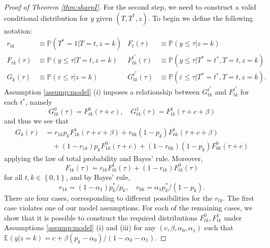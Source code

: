 \begin{proof}[Proof of Theorem \ref{thm:sharpI}]
For the second step, we need to construct a valid conditional distribution for $y$ given $(T,T^*,z)$.
To begin we define the following notation:
\begin{align*}
r_{tk} &\equiv \mathbb{P}(T^*=1|T=t,z=k) &
F_{t}(\tau) &\equiv \mathbb{P}(y \leq \tau|z=k) \\
F_{tk}(\tau) &\equiv \mathbb{P}(y \leq \tau|T=t, z=k) & 
F_{tk}^{t^*}(\tau) &\equiv \mathbb{P}(y \leq \tau|T^*=t^*,T=t, z=k)\\
G_k(\tau) &\equiv \mathbb{P}(\varepsilon \leq \tau|z=k) &
G^{t^*}_{tk}(\tau) &\equiv \mathbb{P}(\varepsilon \leq \tau|T^*=t^*, T=t,z=k).
\end{align*}
Assumption \ref{assump:model} (i) imposes a relationship between $G^{t^*}_{tk}$ and $F^{t^*}_{tk}$ for each $t^*$, namely 
\begin{equation}
  G^0_{tk}(\tau) = F^0_{tk}(\tau + c), \quad
  G^1_{tk}(\tau) = F^1_{tk}(\tau + c + \beta)
  \label{eq:Gtstartk}
\end{equation}
and thus we see that
\begin{align}
  G_k(\tau) &= r_{1k}p_k F^1_{1k}(\tau + c + \beta) + r_{0k}(1 - p_k) F^1_{0k}(\tau + c + \beta) \nonumber \\
  &\quad +  (1 - r_{1k})p_k F^0_{1k}(\tau + c) + (1 - r_{0k})(1 - p_k) F^0_{0k}(\tau + c)
  \label{eq:Gk}
\end{align}
applying the law of total probability and Bayes' rule.
Moreover,
\begin{equation}
  F_{tk}(\tau) = r_{tk} F_{tk}^1(\tau) + (1 - r_{tk}) F_{tk}^0(\tau)
  \label{eq:Ftk}
\end{equation}
for all $t,k \in \left\{ 0,1 \right\}$, and by Bayes' rule,
\begin{equation}
  r_{1k} = (1 - \alpha_1)p_k^*/p_k, \quad
  r_{0k} = \alpha_1p_k^*/(1 - p_k).
  \label{eq:rtk}
\end{equation}
There are four cases, corresponding to different possibilities for the $r_{tk}$.
The first case violates one of our model assumptions.
For each of the remaining cases, we show that it is possible to construct the required distributions $F_{tk}^0, F_{tk}^1$ under Assumptions \ref{assump:model} (i) and (iii) for any $(c,\beta,\alpha_0, \alpha_1)$ such that $\mathbb{E}(y|z=k) = c + \beta(p_k - \alpha_0)/(1 - \alpha_0 - \alpha_1)$.


\end{proof}
